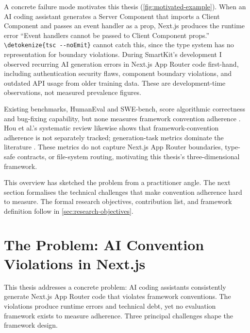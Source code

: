 \documentclass[12pt,a4paper]{report}
\newcommand{\code}[1]{\texttt{\nolinkurl{\detokenize{#1}}}}
\begin{document}
A concrete failure mode motivates this thesis (\autoref{fig:motivated-example}). When an AI coding assistant generates a Server Component that imports a Client Component and passes an event handler as a prop, Next.js produces the runtime error ``Event handlers cannot be passed to Client Component props.'' \code{tsc --noEmit} cannot catch this, since the type system has no representation for boundary violations. During SmartKit's development I observed recurring AI generation errors in Next.js App Router code first-hand, including authentication security flaws, component boundary violations, and outdated API usage from older training data. These are development-time observations, not measured prevalence figures.

Existing benchmarks, HumanEval and SWE-bench, score algorithmic correctness and bug-fixing capability, but none measures framework convention adherence \parencite{chen2021evaluating,jimenez2024swebench}. Hou et al.'s systematic review likewise shows that framework-convention adherence is not separately tracked; generation-task metrics dominate the literature \parencite{hou2024llmse}. These metrics do not capture Next.js App Router boundaries, type-safe contracts, or file-system routing, motivating this thesis's three-dimensional framework.

This overview has sketched the problem from a practitioner angle. The next section formalises the technical challenges that make convention adherence hard to measure. The formal research objectives, contribution list, and framework definition follow in \autoref{sec:research-objectives}.

\section{The Problem: AI Convention Violations in Next.js}

This thesis addresses a concrete problem: AI coding assistants consistently generate Next.js App Router code that violates framework conventions. The violations produce runtime errors and technical debt, yet no evaluation framework exists to measure adherence. Three principal challenges shape the framework design.
\end{document}
